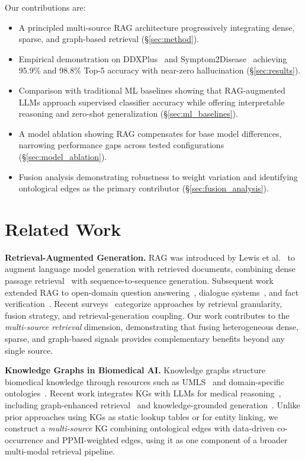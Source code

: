 \documentclass[runningheads]{llncs}
\begin{document}
Our contributions are:
\begin{itemize}
    \item A principled multi-source RAG architecture progressively integrating dense, sparse, and graph-based retrieval (\S\ref{sec:method}).
    \item Empirical demonstration on DDXPlus~\cite{fansi2022ddxplus} and Symptom2Disease~\cite{gretelai_s2d} achieving 95.9\% and 98.8\% Top-5 accuracy with near-zero hallucination (\S\ref{sec:results}).
    \item Comparison with traditional ML baselines showing that RAG-augmented LLMs approach supervised classifier accuracy while offering interpretable reasoning and zero-shot generalization (\S\ref{sec:ml_baselines}).
    \item A model ablation showing RAG compensates for base model differences, narrowing performance gaps across tested configurations (\S\ref{sec:model_ablation}).
    \item Fusion analysis demonstrating robustness to weight variation and identifying ontological edges as the primary contributor (\S\ref{sec:fusion_analysis}).
\end{itemize}

\section{Related Work}
\label{sec:related}

\textbf{Retrieval-Augmented Generation.} RAG was introduced by Lewis et al.~\cite{lewis2020retrieval} to augment language model generation with retrieved documents, combining dense passage retrieval~\cite{karpukhin2020dense} with sequence-to-sequence generation. Subsequent work extended RAG to open-domain question answering~\cite{izacard2021leveraging}, dialogue systems~\cite{shuster2021retrieval}, and fact verification~\cite{thorne2018fever}. Recent surveys~\cite{gao2023retrieval,zhao2024retrieval} categorize approaches by retrieval granularity, fusion strategy, and retrieval-generation coupling. Our work contributes to the \emph{multi-source retrieval} dimension, demonstrating that fusing heterogeneous dense, sparse, and graph-based signals provides complementary benefits beyond any single source.

\textbf{Knowledge Graphs in Biomedical AI.} Knowledge graphs structure biomedical knowledge through resources such as UMLS~\cite{bodenreider2004unified} and domain-specific ontologies~\cite{santos2022knowledge,chandak2023building}. Recent work integrates KGs with LLMs for medical reasoning~\cite{pan2024unifying}, including graph-enhanced retrieval~\cite{he2024gretriever} and knowledge-grounded generation~\cite{yasunaga2022deep}. Unlike prior approaches using KGs as static lookup tables or for entity linking, we construct a \emph{multi-source} KG combining ontological edges with data-driven co-occurrence and PPMI-weighted edges, using it as one component of a broader multi-modal retrieval pipeline.
\end{document}
